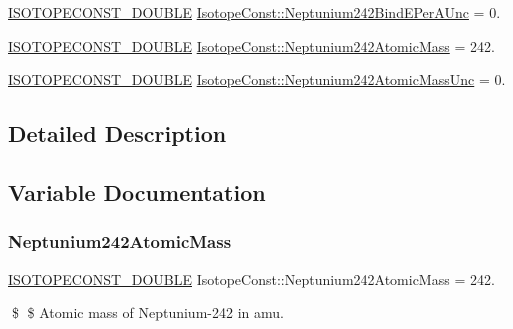 \begin{DoxyCompactItemize}
\mbox{\hyperlink{group___isotope_const-_macros_ga8f45a7272ce02c0b4c65c44636ed719a}{I\+S\+O\+T\+O\+P\+E\+C\+O\+N\+S\+T\+\_\+\+D\+O\+U\+B\+LE}} \mbox{\hyperlink{group___isotope_const-_neptunium-_np242_ga274d2331625f6a156fcfc223da51b3a7}{Isotope\+Const\+::\+Neptunium242\+Bind\+E\+Per\+A\+Unc}} = 0.
\item 
\mbox{\hyperlink{group___isotope_const-_macros_ga8f45a7272ce02c0b4c65c44636ed719a}{I\+S\+O\+T\+O\+P\+E\+C\+O\+N\+S\+T\+\_\+\+D\+O\+U\+B\+LE}} \mbox{\hyperlink{group___isotope_const-_neptunium-_np242_ga2edcf68f193b00a260e0c9e37846a5ea}{Isotope\+Const\+::\+Neptunium242\+Atomic\+Mass}} = 242.
\item 
\mbox{\hyperlink{group___isotope_const-_macros_ga8f45a7272ce02c0b4c65c44636ed719a}{I\+S\+O\+T\+O\+P\+E\+C\+O\+N\+S\+T\+\_\+\+D\+O\+U\+B\+LE}} \mbox{\hyperlink{group___isotope_const-_neptunium-_np242_gab6a9ec3396d6dcecf9e12a3f1c3053f9}{Isotope\+Const\+::\+Neptunium242\+Atomic\+Mass\+Unc}} = 0.
\end{DoxyCompactItemize}


\subsection{Detailed Description}


\subsection{Variable Documentation}
\mbox{\label{group___isotope_const-_neptunium-_np242_ga2edcf68f193b00a260e0c9e37846a5ea}} 
\subsubsection{\texorpdfstring{Neptunium242\+Atomic\+Mass}{Neptunium242AtomicMass}}
{\footnotesize\ttfamily \mbox{\hyperlink{group___isotope_const-_macros_ga8f45a7272ce02c0b4c65c44636ed719a}{I\+S\+O\+T\+O\+P\+E\+C\+O\+N\+S\+T\+\_\+\+D\+O\+U\+B\+LE}} Isotope\+Const\+::\+Neptunium242\+Atomic\+Mass = 242.}

\$ \$ Atomic mass of Neptunium-\/242 in amu. \mbox{\label{group___isotope_const-_neptunium-_np242_gab6a9ec3396d6dcecf9e12a3f1c3053f9}} 
